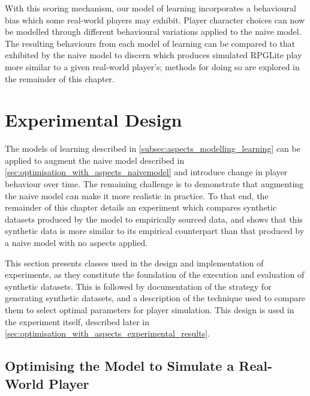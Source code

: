 With this scoring mechanism, our model of learning incorporates a behavioural bias which some real-world players
may exhibit. Player character choices can now be modelled through different behavioural variations applied to the 
naive model. The resulting behaviours from each model of learning can be compared to that exhibited by the naive model
to discern which produces simulated RPGLite play more similar to a given real-world player's;
methods for doing so are explored in the remainder of this chapter. 







\section{Experimental Design}
\label{sec:optimisation_with_aspects_experimental_design}

The models of learning described in \cref{subsec:aspects_modelling_learning} can
be applied to augment the naive model described in
\cref{sec:optimisation_with_aspects_naivemodel} and introduce change in player
behaviour over time. The remaining challenge is to demonstrate that augmenting
the naive model can make it more realistic in practice. To that end, the
remainder of this chapter details an experiment which compares synthetic
datasets produced by the model to empirically sourced data, and shows that this
synthetic data is more similar to its empirical counterpart than that produced
by a naive model with no aspects applied.

This section presents classes used in the design and implementation of
experiments, as they constitute the foundation of the execution and evaluation
of synthetic datasets. This is followed by documentation of the strategy for
generating synthetic datasets, and a description of the technique used to
compare them to select optimal parameters for player simulation. This design is
used in the experiment itself, described later in
\cref{sec:optimisation_with_aspects_experimental_results}.


\subsection{Optimising the Model to Simulate a Real-World Player}
\label{exp1:optimisation_strategy}


